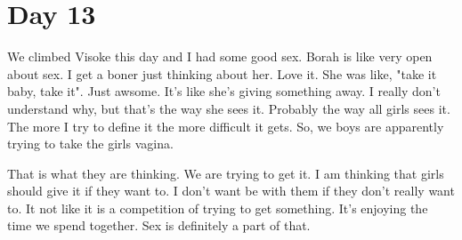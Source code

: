 \section{Day 13}
We climbed Visoke this day and I had some good sex.
Borah is like very open about sex. I get a boner just thinking about her.
Love it. She was like, "take it baby, take it". Just awsome.
It's like she's giving something away. I really don't understand why, but that's the way she sees it.
Probably the way all girls sees it. 
The more I try to define it the more difficult it gets. 
So, we boys are apparently trying to take the girls vagina.

That is what they are thinking. We are trying to get it.
I am thinking that girls should give it if they want to. 
I don't want be with them if they don't really want to. 
It not like it is a competition of trying to get something.
It's enjoying the time we spend together. Sex is definitely a part of that.